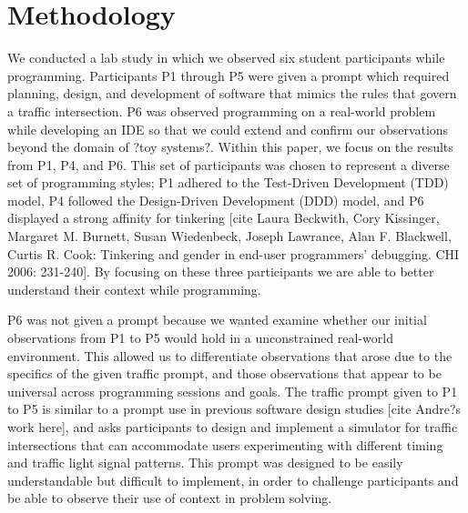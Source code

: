 
\section{Methodology}

We conducted a lab study in which we observed six student participants while programming. Participants P1 through P5 were given a prompt which required planning, design, and development of software that mimics the rules that govern a traffic intersection. P6 was observed programming on a real-world problem while developing an IDE so that we could extend and confirm our observations beyond the domain of ?toy systems?. Within this paper, we focus on the results from P1, P4, and P6. This set of participants was chosen to represent a diverse set of programming styles; P1 adhered to the Test-Driven Development (TDD) model, P4 followed the Design-Driven Development (DDD) model, and P6 displayed a strong affinity for tinkering [cite Laura Beckwith, Cory Kissinger, Margaret M. Burnett, Susan Wiedenbeck, Joseph Lawrance, Alan F. Blackwell, Curtis R. Cook: Tinkering and gender in end-user programmers' debugging. CHI 2006: 231-240]. By focusing on these three participants we are able to better understand their context while programming. 


P6 was not given a prompt because we wanted examine whether our initial observations from P1 to P5 would hold in a unconstrained real-world environment. This allowed us to differentiate observations that arose due to the specifics of the given traffic prompt, and those observations that appear to be universal across programming sessions and goals. The traffic prompt given to P1 to P5 is similar to a prompt use in previous software design studies [cite Andre?s work here], and asks participants to design and implement a simulator for traffic intersections that can accommodate users experimenting with different timing and traffic light signal patterns. This prompt was designed to be easily understandable but difficult to implement, in order to challenge participants and be able to observe their use of context in problem solving.

